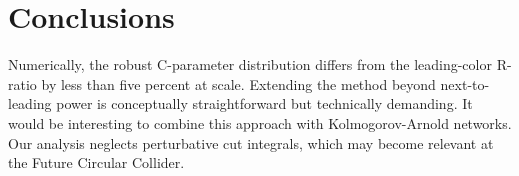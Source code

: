 \section{Conclusions}\label{sec:conclusions}

Numerically, the robust C-parameter distribution differs from the
leading-color R-ratio by less than five percent at scale. Extending the
method beyond next-to-leading power is conceptually straightforward but
technically demanding. It would be interesting to combine this approach
with Kolmogorov-Arnold networks. Our analysis neglects perturbative cut
integrals, which may become relevant at the Future Circular Collider.


